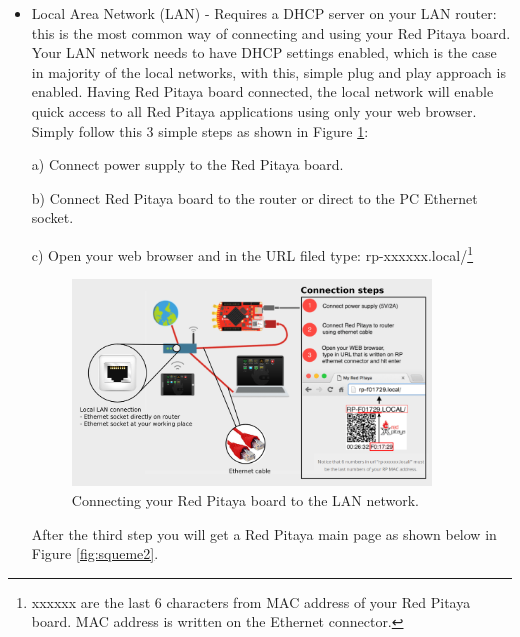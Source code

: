 \documentclass[12pt]{extarticle}
\begin{document}
\begin{itemize}
\item Local Area Network (LAN) - Requires a DHCP server on your LAN router: this is the most common way of connecting and using your Red Pitaya board. Your LAN network needs to have DHCP settings enabled, which is the case in majority of the local networks, with this, simple plug and play approach is enabled. Having Red Pitaya board connected, the local network will enable quick access to all Red Pitaya applications using only your web browser. Simply follow this 3 simple steps as shown in Figure \ref{fig:fig1}:


a) Connect power supply to the Red Pitaya board.

b) Connect Red Pitaya board to the router or direct to the PC Ethernet socket.

c) Open your web browser and in the URL filed type: rp-xxxxxx.local/\footnote{xxxxxx are the last 6 characters from MAC address of your Red Pitaya board. MAC address is written on the Ethernet connector.}

\begin{figure}[!h]
	\begin{center}
		\includegraphics[width=0.9\textwidth]{images2/connect-2} 
		\caption{Connecting your Red Pitaya board to the LAN network.}
		\label{fig:fig1}
	\end{center}
\end{figure}

After the third step you will get a Red Pitaya main page as shown below in Figure \ref{fig:squeme2}.


\end{itemize}
\end{document}

